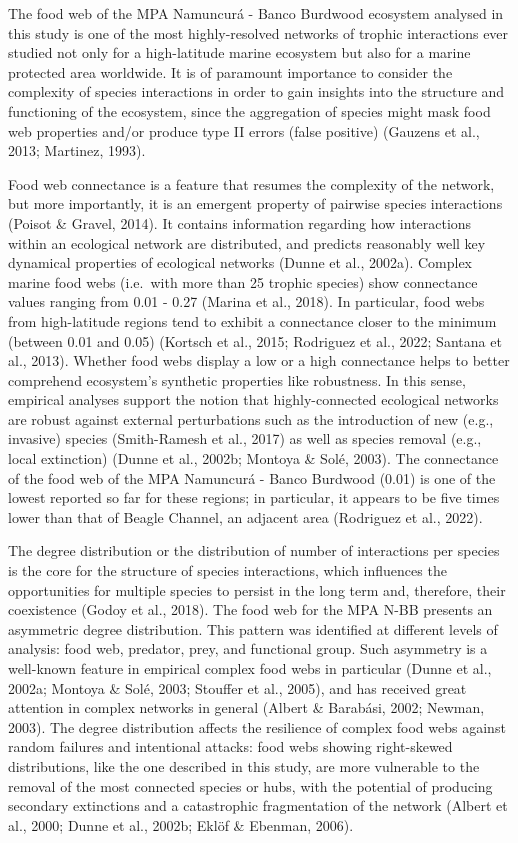 \documentclass[preprint, 3p,
authoryear]{elsarticle} %
\begin{document}
The food web of the MPA Namuncurá - Banco Burdwood ecosystem analysed in
this study is one of the most highly-resolved networks of trophic
interactions ever studied not only for a high-latitude marine ecosystem
but also for a marine protected area worldwide. It is of paramount
importance to consider the complexity of species interactions in order
to gain insights into the structure and functioning of the ecosystem,
since the aggregation of species might mask food web properties and/or
produce type II errors (false positive) (Gauzens et al., 2013; Martinez,
1993).

Food web connectance is a feature that resumes the complexity of the
network, but more importantly, it is an emergent property of pairwise
species interactions (Poisot \& Gravel, 2014). It contains information
regarding how interactions within an ecological network are distributed,
and predicts reasonably well key dynamical properties of ecological
networks (Dunne et al., 2002a). Complex marine food webs (i.e.~with more
than 25 trophic species) show connectance values ranging from 0.01 -
0.27 (Marina et al., 2018). In particular, food webs from high-latitude
regions tend to exhibit a connectance closer to the minimum (between
0.01 and 0.05) (Kortsch et al., 2015; Rodriguez et al., 2022; Santana et
al., 2013). Whether food webs display a low or a high connectance helps
to better comprehend ecosystem's synthetic properties like robustness.
In this sense, empirical analyses support the notion that
highly-connected ecological networks are robust against external
perturbations such as the introduction of new (e.g., invasive) species
(Smith-Ramesh et al., 2017) as well as species removal (e.g., local
extinction) (Dunne et al., 2002b; Montoya \& Solé, 2003). The
connectance of the food web of the MPA Namuncurá - Banco Burdwood (0.01)
is one of the lowest reported so far for these regions; in particular,
it appears to be five times lower than that of Beagle Channel, an
adjacent area (Rodriguez et al., 2022).

The degree distribution or the distribution of number of interactions
per species is the core for the structure of species interactions, which
influences the opportunities for multiple species to persist in the long
term and, therefore, their coexistence (Godoy et al., 2018). The food
web for the MPA N-BB presents an asymmetric degree distribution. This
pattern was identified at different levels of analysis: food web,
predator, prey, and functional group. Such asymmetry is a well-known
feature in empirical complex food webs in particular (Dunne et al.,
2002a; Montoya \& Solé, 2003; Stouffer et al., 2005), and has received
great attention in complex networks in general (Albert \& Barabási,
2002; Newman, 2003). The degree distribution affects the resilience of
complex food webs against random failures and intentional attacks: food
webs showing right-skewed distributions, like the one described in this
study, are more vulnerable to the removal of the most connected species
or hubs, with the potential of producing secondary extinctions and a
catastrophic fragmentation of the network (Albert et al., 2000; Dunne et
al., 2002b; Eklöf \& Ebenman, 2006).
\end{document}
